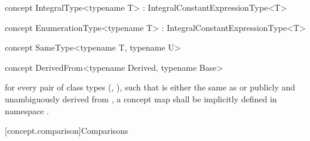\documentclass[american,twoside]{book}
\begin{document}
\begin{itemdecl}
concept IntegralType<typename T> : IntegralConstantExpressionType<T> { }
\end{itemdecl}

\begin{itemdescr}
\pnum
{}

\pnum
{}
\end{itemdescr}

\begin{itemdecl}
concept EnumerationType<typename T> : IntegralConstantExpressionType<T> { }
\end{itemdecl}

\begin{itemdescr}
\pnum
{} 

\pnum
{}
\end{itemdescr}

\begin{itemdecl}
concept SameType<typename T, typename U> { }
\end{itemdecl}

\begin{itemdescr}
\pnum
{}
\end{itemdescr}

\begin{itemdecl}
concept DerivedFrom<typename Derived, typename Base> { }
\end{itemdecl}

\begin{itemdescr}
\pnum
\mbox{\requires}
for every pair of class types (\mbox{}, \mbox{}),
such that \mbox{} is either the same as or publicly and
unambiguously derived from \mbox{}, a concept map
\mbox{} shall be implicitly defined in namespace
\mbox{}.
\end{itemdescr}

[concept.comparison]{Comparisons}
\begin{itemdescr}
\pnum 
{}
\end{itemdescr}
\end{document}

